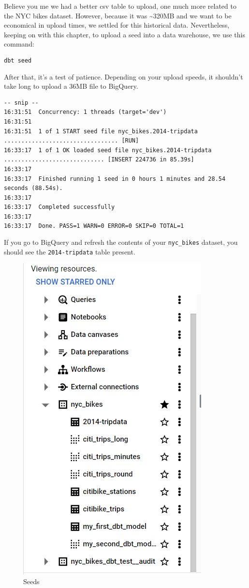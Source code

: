 \documentclass[
]{book}
\begin{document}
Believe you me we had a better csv table to upload, one much more related to the NYC bikes dataset. However, because it was \textasciitilde320MB and we want to be economical in upload times, we settled for this historical data. Nevertheless, keeping on with this chapter, to upload a seed into a data warehouse, we use this command:

\begin{verbatim}
dbt seed
\end{verbatim}

After that, it's a test of patience. Depending on your upload speeds, it shouldn't take long to upload a 36MB file to BigQuery.

\begin{verbatim}
-- snip --
16:31:51  Concurrency: 1 threads (target='dev')
16:31:51  
16:31:51  1 of 1 START seed file nyc_bikes.2014-tripdata ................................. [RUN]
16:33:17  1 of 1 OK loaded seed file nyc_bikes.2014-tripdata ............................. [INSERT 224736 in 85.39s]
16:33:17  
16:33:17  Finished running 1 seed in 0 hours 1 minutes and 28.54 seconds (88.54s).
16:33:17  
16:33:17  Completed successfully
16:33:17  
16:33:17  Done. PASS=1 WARN=0 ERROR=0 SKIP=0 TOTAL=1
\end{verbatim}

If you go to BigQuery and refresh the contents of your \texttt{nyc\_bikes} dataset, you should see the \texttt{2014-tripdata} table present.

\begin{figure}
\centering
\includegraphics{./images/2014-tripdata.png}
\caption{Seeds}
\end{figure}
\end{document}
